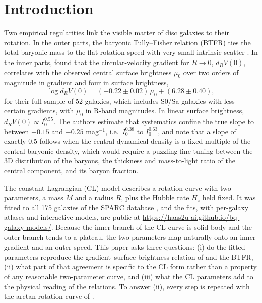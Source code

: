 \documentclass[11pt,a4paper]{article}
\begin{document}
\section{Introduction}

Two empirical regularities link the visible matter of disc galaxies to their rotation. In the outer parts, the baryonic Tully--Fisher relation (BTFR) ties the total baryonic mass to the flat rotation speed with very small intrinsic scatter \citep{McGaugh2000,Lelli2016btfr,Lelli2019}. In the inner parts, \citet{Lelli2013} found that the circular-velocity gradient for $R\to0$, $d_RV(0)$, correlates with the observed central surface brightness $\mu_0$ over two orders of magnitude in gradient and four in surface brightness,
\begin{equation}
\log d_RV(0) = (-0.22\pm0.02)\,\mu_0 + (6.28\pm0.40),
\label{eq:lelli}
\end{equation}
for their full sample of 52 galaxies, which includes S0/Sa galaxies with less certain gradients, with $\mu_0$ in R-band magnitudes. In linear surface brightness, $d_RV(0)\propto I_0^{0.55}$. The authors estimate that systematics confine the true slope to between $-0.15$ and $-0.25$ mag$^{-1}$, i.e.\ $I_0^{0.38}$ to $I_0^{0.63}$, and note that a slope of exactly $0.5$ follows when the central dynamical density is a fixed multiple of the central baryonic density, which would require a puzzling fine-tuning between the 3D distribution of the baryons, the thickness and mass-to-light ratio of the central component, and its baryon fraction.

The constant-Lagrangian (CL) model \citep{deHaas2018,deHaas2025a,deHaas2025b} describes a rotation curve with two parameters, a mass $M$ and a radius $R$, plus the Hubble rate $H_z$ held fixed. It was fitted to all 175 galaxies of the SPARC database \citep{Lelli2016sparc}, and the fits, with per-galaxy atlases and interactive models, are public at \url{https://haas2u-ai.github.io/bq-galaxy-models/}. Because the inner branch of the CL curve is solid-body and the outer branch tends to a plateau, the two parameters map naturally onto an inner gradient and an outer speed. This paper asks three questions: (i) do the fitted parameters reproduce the gradient--surface brightness relation of \citet{Lelli2013} and the BTFR, (ii) what part of that agreement is specific to the CL form rather than a property of any reasonable two-parameter curve, and (iii) what the CL parameters add to the physical reading of the relations. To answer (ii), every step is repeated with the arctan rotation curve of \citet{Courteau1997}.
\end{document}
